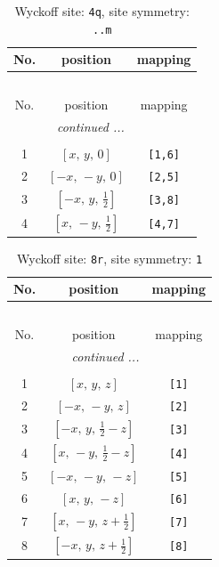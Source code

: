 \documentclass[fleqn,8pt]{jsarticle}
\begin{document}
\renewcommand{\arraystretch}{1.2}
\begin{longtable}{ccc}
\caption{Wyckoff site: {\tt 4q}, site symmetry: {\tt ..m}}
 \\
 \hline \hline
No. & position & mapping \\ \hline \endfirsthead

\multicolumn{2}{l}{\tablename\ \thetable{}} \\
 \hline \hline
No. & position & mapping \\ \hline \endhead

 \hline \hline
\multicolumn{2}{r}{\footnotesize\it continued ...} \\ \endfoot

 \hline \hline
\multicolumn{2}{r}{} \\ \endlastfoot

1 & $\left[ x,\, y,\, 0 \right]$ & {\tt [1,6]} \\ \hline
2 & $\left[ - x,\, - y,\, 0 \right]$ & {\tt [2,5]} \\ \hline
3 & $\left[ - x,\, y,\, \frac{1}{2} \right]$ & {\tt [3,8]} \\ \hline
4 & $\left[ x,\, - y,\, \frac{1}{2} \right]$ & {\tt [4,7]} \\
\end{longtable}
\renewcommand{\arraystretch}{1.2}
\begin{longtable}{ccc}
\caption{Wyckoff site: {\tt 8r}, site symmetry: {\tt 1}}
 \\
 \hline \hline
No. & position & mapping \\ \hline \endfirsthead

\multicolumn{2}{l}{\tablename\ \thetable{}} \\
 \hline \hline
No. & position & mapping \\ \hline \endhead

 \hline \hline
\multicolumn{2}{r}{\footnotesize\it continued ...} \\ \endfoot

 \hline \hline
\multicolumn{2}{r}{} \\ \endlastfoot

1 & $\left[ x,\, y,\, z \right]$ & {\tt [1]} \\ \hline
2 & $\left[ - x,\, - y,\, z \right]$ & {\tt [2]} \\ \hline
3 & $\left[ - x,\, y,\, \frac{1}{2} - z \right]$ & {\tt [3]} \\ \hline
4 & $\left[ x,\, - y,\, \frac{1}{2} - z \right]$ & {\tt [4]} \\ \hline
5 & $\left[ - x,\, - y,\, - z \right]$ & {\tt [5]} \\ \hline
6 & $\left[ x,\, y,\, - z \right]$ & {\tt [6]} \\ \hline
7 & $\left[ x,\, - y,\, z + \frac{1}{2} \right]$ & {\tt [7]} \\ \hline
8 & $\left[ - x,\, y,\, z + \frac{1}{2} \right]$ & {\tt [8]} \\
\end{longtable}
\end{document}

